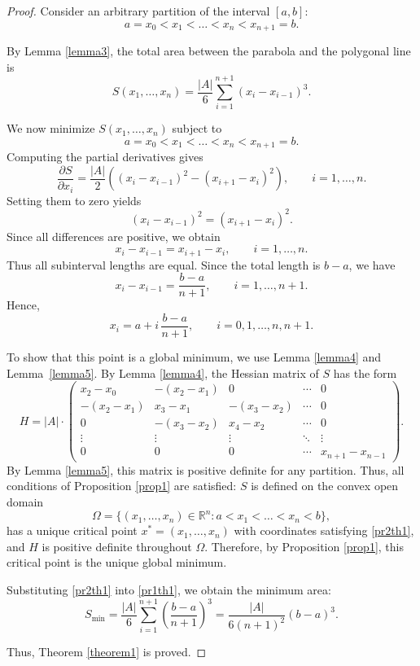 \documentclass[amstex,16pt, amssymb]{article}
\theoremstyle{plain}
\theoremstyle{definition}
\numberwithin{equation}{section}
\numberwithin{equation}{section}
\begin{document}
\begin{proof}
Consider an arbitrary partition of the interval \([a, b]\):
\[
a = x_0 < x_1 < \dots < x_n < x_{n+1} = b.
\]

By Lemma \ref{lemma3}, the total area between the parabola and the polygonal line is
\begin{equation}\label{pr1th1}
S(x_1, \dots, x_n) =  \frac{|A|}{6} \sum_{i=1}^{n+1} (x_i - x_{i-1})^3.
\end{equation}

We now minimize \(S(x_1, \dots, x_n)\) subject to
\[
a = x_0 < x_1 < \dots < x_n < x_{n+1} = b.
\]
Computing the partial derivatives gives
\[
\frac{\partial S}{\partial x_i} = \frac{|A|}{2} \left( (x_i - x_{i-1})^2 - (x_{i+1} - x_i)^2 \right), \qquad i = 1, \dots, n.
\]
Setting them to zero yields
\[
(x_i - x_{i-1})^2 = (x_{i+1} - x_i)^2.
\]
Since all differences are positive, we obtain
\[
x_i - x_{i-1} = x_{i+1} - x_i, \qquad i = 1, \dots, n.
\]
Thus all subinterval lengths are equal. Since the total length is \(b-a\), we have
\[
x_i - x_{i-1} = \frac{b-a}{n+1}, \qquad i = 1, \dots, n+1.
\]
Hence,
\begin{equation}\label{pr2th1}
x_i = a + i \,\frac{b-a}{n+1}, \qquad i = 0, 1, \dots, n, n+1.
\end{equation}

To show that this point is a global minimum, we use Lemma \ref{lemma4} and Lemma~\ref{lemma5}.
By Lemma \ref{lemma4}, the Hessian matrix of \(S\) has the form
\[
H = |A| \cdot
\begin{pmatrix}
x_2 - x_0 & -(x_2 - x_1) & 0 & \cdots & 0 \\
-(x_2 - x_1) & x_3 - x_1 & -(x_3 - x_2) & \cdots & 0 \\
0 & -(x_3 - x_2) & x_4 - x_2 & \cdots & 0 \\
\vdots & \vdots & \vdots & \ddots & \vdots \\
0 & 0 & 0 & \cdots & x_{n+1} - x_{n-1}
\end{pmatrix}.
\]
By Lemma \ref{lemma5}, this matrix is positive definite for any partition.
Thus, all conditions of Proposition \ref{prop1} are satisfied:
\(S\) is defined on the convex open domain
\[
\Omega = \{ (x_1, \dots, x_n)\in \mathbb{R}^{n}: a < x_1 < \dots < x_n < b \},
\]
has a unique critical point $x^{*}=(x_1, \dots, x_n)$ with coordinates satisfying \eqref{pr2th1}, and \(H\) is positive definite throughout \(\Omega\).
Therefore, by Proposition \ref{prop1}, this critical point is the unique global minimum.

Substituting \eqref{pr2th1} into \eqref{pr1th1}, we obtain the minimum area:
\[
S_{\min} = \frac{|A|}{6} \sum_{i=1}^{n+1} \left( \frac{b-a}{n+1} \right)^3
= \frac{|A|}{6(n+1)^2}(b-a)^3.
\]

Thus, Theorem \ref{theorem1} is proved. 
\end{proof}
\end{document}
